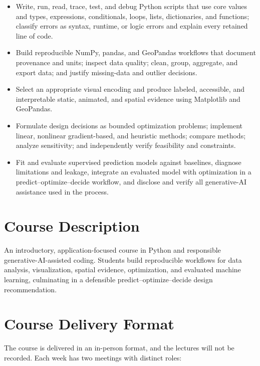 \documentclass[11pt]{article}
\begin{document}
\begin{itemize}
  \item Write, run, read, trace, test, and debug Python scripts that use core values and types,
        expressions, conditionals, loops, lists, dictionaries, and functions; classify errors
        as syntax, runtime, or logic errors and explain every retained line of code.
  \item Build reproducible NumPy, pandas, and GeoPandas workflows that document provenance and
        units; inspect data quality; clean, group, aggregate, and export data; and justify
        missing-data and outlier decisions.
  \item Select an appropriate visual encoding and produce labeled, accessible, and
        interpretable static, animated, and spatial evidence using Matplotlib and GeoPandas.
  \item Formulate design decisions as bounded optimization problems; implement linear,
        nonlinear gradient-based, and heuristic methods; compare methods; analyze sensitivity;
        and independently verify feasibility and constraints.
  \item Fit and evaluate supervised prediction models against baselines, diagnose limitations
        and leakage, integrate an evaluated model with optimization in a
        predict--optimize--decide workflow, and disclose and verify all generative-AI
        assistance used in the process.
\end{itemize}

\section{Course Description}

An introductory, application-focused course in Python and responsible generative-AI-assisted
coding. Students build reproducible workflows for data analysis, visualization, spatial
evidence, optimization, and evaluated machine learning, culminating in a defensible
predict--optimize--decide design recommendation.

\section{Course Delivery Format}

The course is delivered in an in-person format, and the lectures will not be recorded. Each
week has two meetings with distinct roles:
\end{document}
